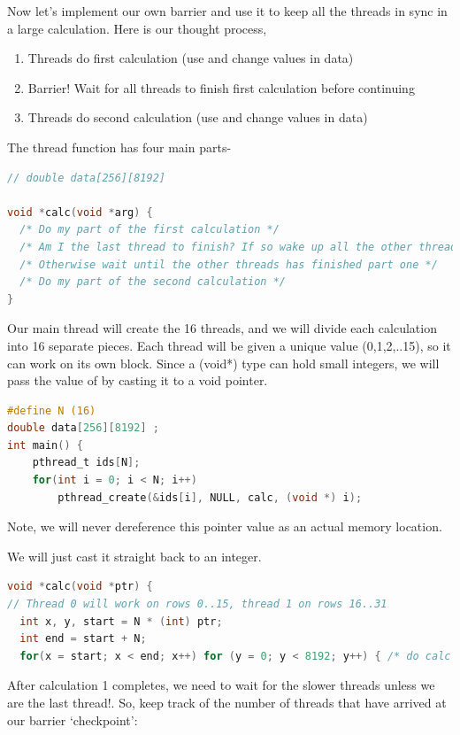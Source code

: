 Now let's implement our own barrier and use it to keep all the threads in sync in a large calculation.
Here is our thought process,

\begin{enumerate}
\item Threads do first calculation (use and change values in data)
\item Barrier! Wait for all threads to finish first calculation before continuing
\item Threads do second calculation (use and change values in data)
\end{enumerate}

The thread function has four main parts-

\begin{lstlisting}[language=C]
// double data[256][8192]

void *calc(void *arg) {
  /* Do my part of the first calculation */
  /* Am I the last thread to finish? If so wake up all the other threads! */
  /* Otherwise wait until the other threads has finished part one */
  /* Do my part of the second calculation */
}
\end{lstlisting}

Our main thread will create the 16 threads, and we will divide each calculation into 16 separate pieces.
Each thread will be given a unique value (0,1,2,..15), so it can work on its own block.
Since a (void*) type can hold small integers, we will pass the value of  by casting it to a void pointer.

\begin{lstlisting}[language=C]
#define N (16)
double data[256][8192] ;
int main() {
    pthread_t ids[N];
    for(int i = 0; i < N; i++)
        pthread_create(&ids[i], NULL, calc, (void *) i);
\end{lstlisting}

Note, we will never dereference this pointer value as an actual memory location.

We will just cast it straight back to an integer.

\begin{lstlisting}[language=C]
void *calc(void *ptr) {
// Thread 0 will work on rows 0..15, thread 1 on rows 16..31
  int x, y, start = N * (int) ptr;
  int end = start + N;
  for(x = start; x < end; x++) for (y = 0; y < 8192; y++) { /* do calc #1 */ }
\end{lstlisting}

After calculation 1 completes, we need to wait for the slower threads unless we are the last thread!.
So, keep track of the number of threads that have arrived at our barrier  `checkpoint':

